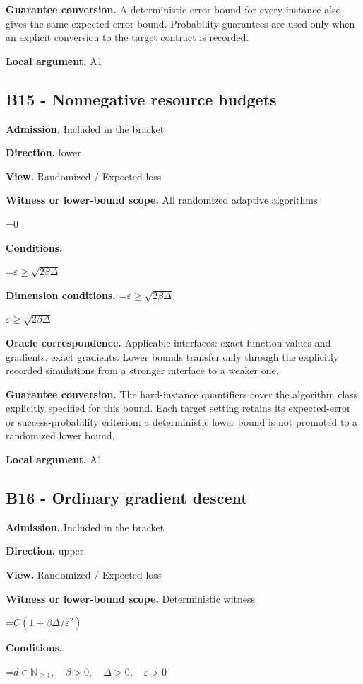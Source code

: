 \documentclass[10pt,a4paper]{article}
\newcommand{\AtlasMath}[1]{\par\begingroup\centering\setbox0=\hbox{$\displaystyle #1$}\ifdim\wd0>1.4\linewidth\typeout{ATLAS WIDE FORMULA: \the\wd0}\fi\ifdim\wd0>\linewidth\resizebox{\linewidth}{!}{\box0}\else\box0\fi\par\endgroup}
\newcommand{\AtlasInlineMath}[1]{\begingroup\setbox0=\hbox{$#1$}\ifdim\wd0>.4\linewidth\endgroup\AtlasMath{#1}\else\endgroup$#1$\fi}
\begin{document}
\textbf{Guarantee conversion.} A deterministic error bound for every instance also gives the same expected-error bound. Probability guarantees are used only when an explicit conversion to the target contract is recorded.

\textbf{Local argument.} A1

\subsection{B15 - Nonnegative resource budgets}
\textbf{Admission.} Included in the bracket

\textbf{Direction.} lower

\textbf{View.} Randomized / Expected loss

\textbf{Witness or lower-bound scope.} All randomized adaptive algorithms

\AtlasMath{0}
\textbf{Conditions.} 


\AtlasMath{\varepsilon\ge\sqrt{2\beta\Delta}}




\textbf{Dimension conditions.} \AtlasInlineMath{\varepsilon\ge\sqrt{2\beta\Delta}}

\textbf{Oracle correspondence.} Applicable interfaces: exact function values and gradients, exact gradients. Lower bounds transfer only through the explicitly recorded simulations from a stronger interface to a weaker one.

\textbf{Guarantee conversion.} The hard-instance quantifiers cover the algorithm class explicitly specified for this bound. Each target setting retains its expected-error or success-probability criterion; a deterministic lower bound is not promoted to a randomized lower bound.

\textbf{Local argument.} A1

\subsection{B16 - Ordinary gradient descent}
\textbf{Admission.} Included in the bracket

\textbf{Direction.} upper

\textbf{View.} Randomized / Expected loss

\textbf{Witness or lower-bound scope.} Deterministic witness

\AtlasMath{C(1+\beta\Delta/\varepsilon^2)}
\textbf{Conditions.} 


\AtlasMath{d\in\mathbb{N}_{\ge1},\quad \beta>0,\quad \Delta>0,\quad \varepsilon>0}
\end{document}
